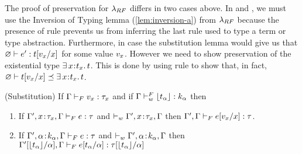 The proof of preservation for $\sysrf$ differs in two cases above. 
In \tApp and \tTApp, we must use the Inversion of Typing lemma (\ref{lem:inversion-a})
from $\sysrf$ because the presence of rule \tSub prevents us from 
inferring the last rule used to type a term or type abstraction.
%
Furthermore, in case \tApp the substitution lemma would give us that 
$\hastype{\varnothing}{\sexpr'}{\subst{\stype}{x}{\sval_x}}$ for 
some value $\sval_x$. However we need to show preservation of the
existential type $\existype{x}{\stype_x}{\stype}$. This is done by
using rule \sWitn to show that, in fact, 
$\isSubType{\varnothing}{\subst{\stype}{x}{\sval_x}}{\existype{x}{\stype_x}{\stype}}$.
\begin{lemma}(Substitution)\label{lem:substitutionF}
    If $\hasftype{\tcenv}{\sval_x}{\sftype_x}$ 
    and if $\isWFFT{\tcenv}{\forgetreft{\stype_{\al}}}{k_{\al}}$ then 
    \begin{enumerate}
    \item If\; $\hasftype{\tcenv', \bind{x}{\sftype_x}, \tcenv}{\sexpr}{\sftype}$
        and $\isWFFE{\tcenv', \bind{x}{\sftype_x}, \tcenv}$ then
        ${\hasftype{\tcenv', \tcenv}{\subst{\sexpr}{x}{\sval_x}}{\sftype}}$.
    \item If\; $\hasftype{\tcenv', \bind{\al}{k_{\al}}, \tcenv}{\sexpr}{\sftype}$
        and $\isWFFE{\tcenv', \bind{\al}{k_{\al}}, \tcenv}$ then
        ${\hasftype{\subst{\tcenv'}{\al}{\forgetreft{\stype_{\al}}}, \tcenv}
                   {\subst{\sexpr}{\al}{\stype_{\al}}}
                   {\subst{\sftype}{\al}{\forgetreft{\stype_{\al}}}}}$
    \end{enumerate}
\end{lemma} 
